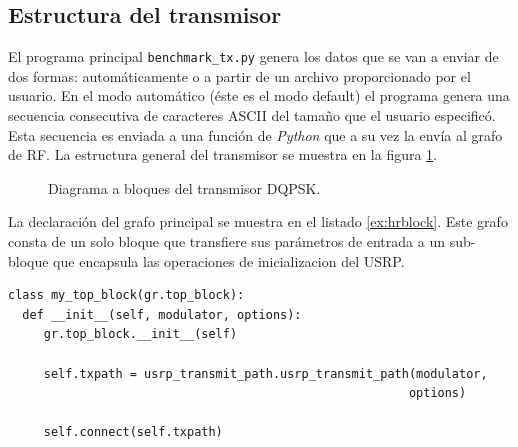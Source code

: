 \subsection{Estructura del transmisor}
El programa principal \verb|benchmark_tx.py| genera los datos que se van a enviar de dos formas:
autom\'aticamente o a partir de un archivo proporcionado por el usuario. En el modo autom\'atico
(\'este es el modo default) el programa genera una secuencia consecutiva de caracteres ASCII del tama\~no
que el usuario especific\'o. Esta secuencia es enviada a una funci\'on de \emph{Python} que a su vez la
env\'ia al grafo de RF. La estructura general del transmisor se muestra en la figura
\ref{fig:grqpsk}.

\begin{figure}[htp]
  \centering
  \vspace{0.5in}
\vspace{0.5in}
\caption{Diagrama a bloques del transmisor DQPSK.}
\label{fig:grqpsk}
\end{figure}

La declaraci\'on del grafo principal se muestra en el listado \ref{ex:hrblock}. Este grafo consta de
un solo bloque que transfiere sus par\'ametros de entrada a un sub-bloque que encapsula las
operaciones de inicializacion del USRP.
 
\begin{lstlisting}[float,frame=single,label=ex:hrblock,caption={Declaraci\'on del bloque
jer\'arquico principal.}]
class my_top_block(gr.top_block):
  def __init__(self, modulator, options):
     gr.top_block.__init__(self)

     self.txpath = usrp_transmit_path.usrp_transmit_path(modulator, 
                                                        options)

     self.connect(self.txpath)
\end{lstlisting}

